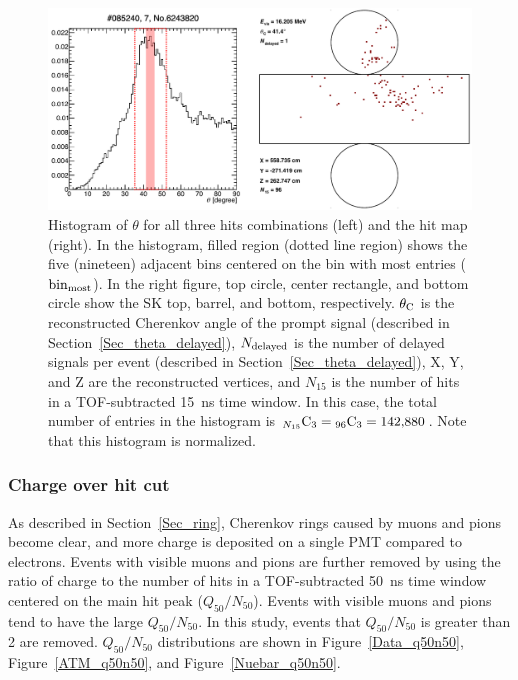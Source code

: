 \begin{figure}[p]
	\centering
	\includegraphics[width=16cm]{Figures/Selection/L_cle}
	\caption[Histogram of $\theta$ for all three hits combinations and the hit map]{
	Histogram of $\theta$ for all three hits combinations (left) and the hit map (right).
	In the histogram, filled region (dotted line region) shows the five (nineteen) adjacent bins centered on the bin with most entries (${\rm bin}_{\rm most}$).
	In the right figure, top circle, center rectangle, and bottom circle show the SK top, barrel, and bottom, respectively.
	$\theta_{{\rm C}}$ is the reconstructed Cherenkov angle of the prompt signal (described in Section~\ref{Sec_theta_delayed}), $N_{\rm delayed}$ is the number of delayed signals per event (described in Section~\ref{Sec_theta_delayed}), X, Y, and Z are the reconstructed vertices, and $N_{15}$ is the number of hits in a TOF-subtracted 15~ns time window.
	In this case, the total number of entries in the histogram is ${}_{N_{15}}{\rm C}_{3} = {}_{96}{\rm C}_{3} = 142{,}880$.
	Note that this histogram is normalized.
	}\label{L_cle}
\end{figure}

\subsubsection{Charge over hit cut}
\vs\hs
As described in Section~\ref{Sec_ring}, Cherenkov rings caused by muons and pions become clear, and more charge is deposited on a single PMT compared to electrons.
Events with visible muons and pions are further removed by using the ratio of charge to the number of hits in a TOF-subtracted 50~ns time window centered on the main hit peak ($Q_{50}/N_{50}$).
Events with visible muons and pions tend to have the large $Q_{50}/N_{50}$.
In this study, events that $Q_{50}/N_{50}$ is greater than 2 are removed.
$Q_{50}/N_{50}$ distributions are shown in Figure~\ref{Data_q50n50}, Figure~\ref{ATM_q50n50}, and Figure~\ref{Nuebar_q50n50}.





